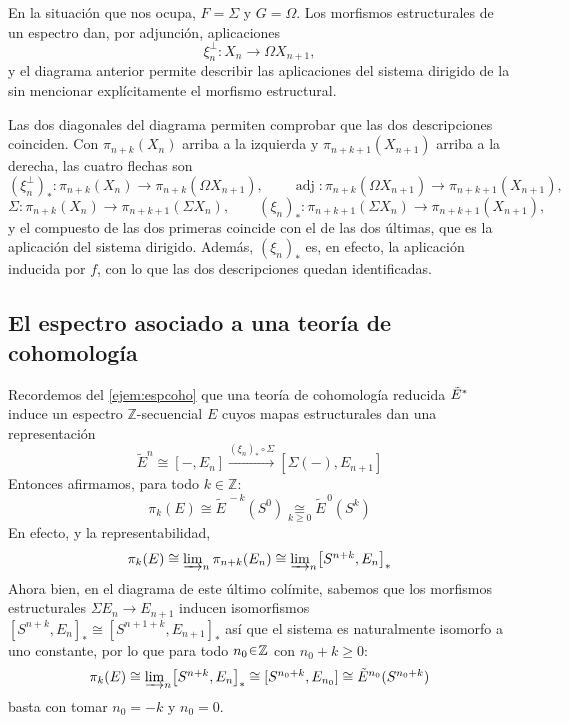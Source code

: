 En la situación que nos ocupa, $F=\Sigma$ y $G=\Omega$. Los morfismos estructurales de un espectro dan, por adjunción, aplicaciones
\[
\xi_n^{\perp}\colon X_n\longrightarrow\Omega X_{n+1},
\]
y el diagrama anterior permite describir las aplicaciones del sistema dirigido de la  sin mencionar explícitamente el morfismo estructural.

\begin{nota}
   Las dos diagonales del diagrama permiten comprobar que las dos descripciones coinciden. Con $\pi_{n+k}(X_n)$ arriba a la izquierda y $\pi_{n+k+1}(X_{n+1})$ arriba a la derecha, las cuatro flechas son
   \[
   (\xi_n^{\perp})_*\colon\pi_{n+k}(X_n)\to\pi_{n+k}(\Omega X_{n+1}),
   \qquad
   \operatorname{adj}\colon\pi_{n+k}(\Omega X_{n+1})\to\pi_{n+k+1}(X_{n+1}),
   \]
   \[
   \Sigma\colon\pi_{n+k}(X_n)\to\pi_{n+k+1}(\Sigma X_n),
   \qquad
   (\xi_n)_*\colon\pi_{n+k+1}(\Sigma X_n)\to\pi_{n+k+1}(X_{n+1}),
   \]
   y el compuesto de las dos primeras coincide con el de las dos últimas, que es la aplicación del sistema dirigido. Además, $(\xi_n)_*$ es, en efecto, la aplicación inducida por $f$, con lo que las dos descripciones quedan identificadas.
\end{nota}

\subsection{El espectro asociado a una teoría de cohomología}


Recordemos del \cref{ejem:espcoho} que una teoría de cohomología reducida $\Tilde{E}^*$ induce un espectro $\mathbb Z$-secuencial $E$ cuyos mapas estructurales dan una representación
\[
\widetilde{E}^n\cong[-,E_n]\xrightarrow{(\xi_n)_*\circ \Sigma} [\Sigma(-),E_{n+1}]
\]
Entonces afirmamos, para todo $k\in\mathbb Z$:
\[
\pi_k(E)\cong\widetilde E^{\,-k}(S^0)\underset{k\ge0}{\cong}\widetilde E^{\,0}(S^k)
\]
En efecto,  y la representabilidad,
\[\textstyle
\pi_k(E)\cong \varinjlim\nolimits_n\pi_{n+k}(E_n)\cong\varinjlim\nolimits_n\bigl[S^{n+k},E_n\bigr]_*
\]
Ahora bien, en el diagrama de este último colímite, sabemos que los morfismos estructurales $\Sigma E_n\to E_{n+1}$ inducen isomorfismos $[S^{n+k},E_{n}]_* \cong [S^{n+1+k},E_{n+1}]_*$ así que el sistema es naturalmente isomorfo a uno constante, por lo que para todo $n_0\en\mathbb Z$ con $n_0+k \ge0$:
\[\textstyle
\pi_k(E)
\cong \varinjlim\nolimits_n\bigl[S^{n+k},E_n\bigr]_*
\cong [S^{n_0+k},E_{n_0}] \cong \Tilde{E}^{n_0}(S^{n_0+k})
\]
basta con tomar $n_0 = -k$ y $n_0=0$. 

